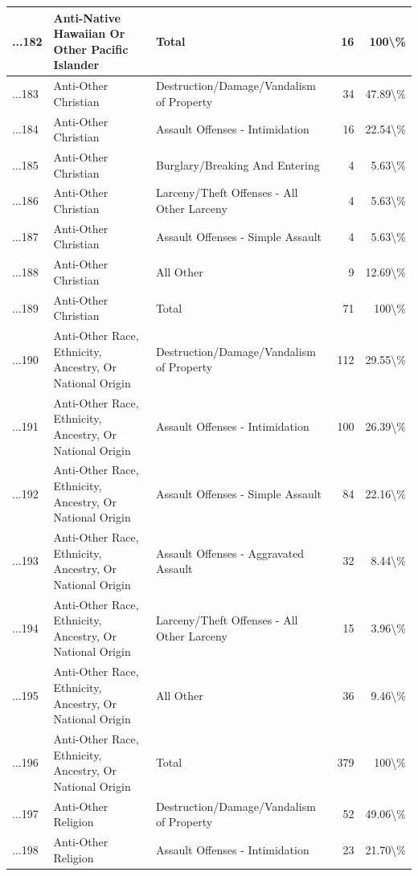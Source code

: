\documentclass[
]{krantz}
\begin{document}
\begin{longtable}[t]{l|l|l|r|r}
\hline
...182 & Anti-Native Hawaiian Or Other Pacific Islander & Total & 16 & 100\textbackslash{}\%\\
\hline
...183 & Anti-Other Christian & Destruction/Damage/Vandalism of Property & 34 & 47.89\textbackslash{}\%\\
\hline
...184 & Anti-Other Christian & Assault Offenses - Intimidation & 16 & 22.54\textbackslash{}\%\\
\hline
...185 & Anti-Other Christian & Burglary/Breaking And Entering & 4 & 5.63\textbackslash{}\%\\
\hline
...186 & Anti-Other Christian & Larceny/Theft Offenses - All Other Larceny & 4 & 5.63\textbackslash{}\%\\
\hline
...187 & Anti-Other Christian & Assault Offenses - Simple Assault & 4 & 5.63\textbackslash{}\%\\
\hline
...188 & Anti-Other Christian & All Other & 9 & 12.69\textbackslash{}\%\\
\hline
...189 & Anti-Other Christian & Total & 71 & 100\textbackslash{}\%\\
\hline
...190 & Anti-Other Race, Ethnicity, Ancestry, Or National Origin & Destruction/Damage/Vandalism of Property & 112 & 29.55\textbackslash{}\%\\
\hline
...191 & Anti-Other Race, Ethnicity, Ancestry, Or National Origin & Assault Offenses - Intimidation & 100 & 26.39\textbackslash{}\%\\
\hline
...192 & Anti-Other Race, Ethnicity, Ancestry, Or National Origin & Assault Offenses - Simple Assault & 84 & 22.16\textbackslash{}\%\\
\hline
...193 & Anti-Other Race, Ethnicity, Ancestry, Or National Origin & Assault Offenses - Aggravated Assault & 32 & 8.44\textbackslash{}\%\\
\hline
...194 & Anti-Other Race, Ethnicity, Ancestry, Or National Origin & Larceny/Theft Offenses - All Other Larceny & 15 & 3.96\textbackslash{}\%\\
\hline
...195 & Anti-Other Race, Ethnicity, Ancestry, Or National Origin & All Other & 36 & 9.46\textbackslash{}\%\\
\hline
...196 & Anti-Other Race, Ethnicity, Ancestry, Or National Origin & Total & 379 & 100\textbackslash{}\%\\
\hline
...197 & Anti-Other Religion & Destruction/Damage/Vandalism of Property & 52 & 49.06\textbackslash{}\%\\
\hline
...198 & Anti-Other Religion & Assault Offenses - Intimidation & 23 & 21.70\textbackslash{}\%\\

\end{longtable}
\end{document}
